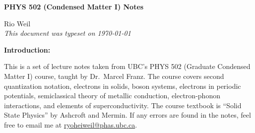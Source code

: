 \documentclass[10pt]{article}
\begin{document}
\begin{tcolorbox}
  \begin{center}
  \begin{Large}
    \textbf{PHYS 502 (Condensed Matter I) Notes} \\
    \vspace{5pt}
  \end{Large}
  \begin{large}
        Rio Weil \\
\vspace{5pt}
    \emph{This document was typeset on \today}
  \end{large}
  \end{center}
\end{tcolorbox}

\begin{center}
  \textbf{Introduction:}

  This is a set of lecture notes taken from UBC's PHYS 502 (Graduate Condensed Matter I) course, taught by Dr.\ Marcel Franz. The course covers second quantization notation, electrons in solids, boson systems, electrons in periodic potentials, semiclassical theory of metallic conduction, electron-phonon interactions, and elements of superconductivity. The course textbook is ``Solid State Physics'' by Ashcroft and Mermin. If any errors are found in the notes, feel free to email me at \href{mailto:ryoheiweil@phas.ubc.ca}{ryoheiweil@phas.ubc.ca}.

\end{center}
\tableofcontents

\newpage

\newpage

\newpage

\newpage
\setcounter{section}{4}

\newpage

\newpage

\newpage

\newpage

\newpage
\setcounter{section}{10}

\newpage

\newpage

\end{document}
